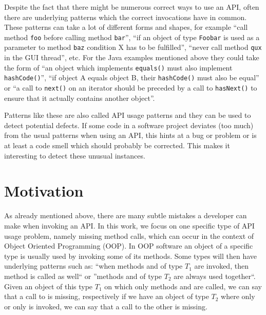 Despite the fact that there might be numerous correct ways to use an API, often there are underlying patterns which the correct invocations have in common.
These patterns can take a lot of different forms and shapes, for example ``call method \texttt{foo} before calling method \texttt{bar}'', ``if an object of type \texttt{Foobar} is used as a parameter to method \texttt{baz} condition X has to be fulfilled'', ``never call method \texttt{qux} in the GUI thread'', etc.
For the Java examples mentioned above they could take the form of ``an object which implements \texttt{equals()} must also implement \texttt{hashCode()}'', ``if object A equals object B, their \texttt{hashCode()} must also be equal'' or ``a call to \texttt{next()} on an iterator should be preceded by a call to \texttt{hasNext()} to ensure that it actually contains another object''.

Patterns like these are also called API usage patterns \cite{robillard2013automated} and they can be used to detect potential defects.
If some code in a software project deviates (too much) from the usual patterns when using an API, this hints at a bug or problem or is at least a code smell which should probably be corrected.
This makes it interesting to detect these unusual instances.

\section{Motivation}

As already mentioned above, there are many subtle mistakes a developer can make when invoking an API.
In this work, we focus on one specific type of API usage problem, namely missing method calls, which can occur in the context of Object Oriented Programming (OOP).
In OOP software an object of a specific type is usually used by invoking some of its methods.
Some types will then have underlying patterns such as: ``when methods  and  of type $T_1$ are invoked, then method  is called as well`` or ''methods  and  of type $T_2$ are always used together``.
Given an object of this type $T_1$ on which only methods  and  are called, we can say that a call to  is missing, respectively if we have an object of type $T_2$ where only  or only  is invoked, we can say that a call to the other is missing.

